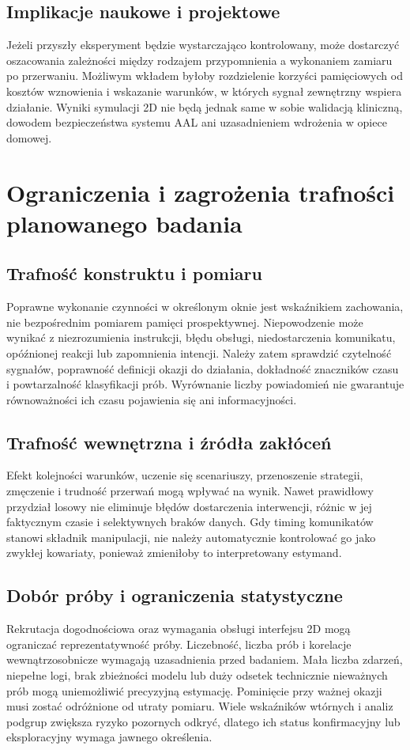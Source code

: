 \documentclass[11pt,a4paper]{article}
\begin{document}
\subsection{Implikacje naukowe i projektowe}
Jeżeli przyszły eksperyment będzie wystarczająco kontrolowany, może dostarczyć oszacowania zależności między rodzajem przypomnienia a wykonaniem zamiaru po przerwaniu. Możliwym wkładem byłoby rozdzielenie korzyści pamięciowych od kosztów wznowienia i wskazanie warunków, w których sygnał zewnętrzny wspiera działanie. Wyniki symulacji 2D nie będą jednak same w sobie walidacją kliniczną, dowodem bezpieczeństwa systemu AAL ani uzasadnieniem wdrożenia w opiece domowej.

\section{Ograniczenia i zagrożenia trafności planowanego badania}
\subsection{Trafność konstruktu i pomiaru}
Poprawne wykonanie czynności w określonym oknie jest wskaźnikiem zachowania, nie bezpośrednim pomiarem pamięci prospektywnej. Niepowodzenie może wynikać z niezrozumienia instrukcji, błędu obsługi, niedostarczenia komunikatu, opóźnionej reakcji lub zapomnienia intencji. Należy zatem sprawdzić czytelność sygnałów, poprawność definicji okazji do działania, dokładność znaczników czasu i powtarzalność klasyfikacji prób. Wyrównanie liczby powiadomień nie gwarantuje równoważności ich czasu pojawienia się ani informacyjności.

\subsection{Trafność wewnętrzna i źródła zakłóceń}
Efekt kolejności warunków, uczenie się scenariuszy, przenoszenie strategii, zmęczenie i trudność przerwań mogą wpływać na wynik. Nawet prawidłowy przydział losowy nie eliminuje błędów dostarczenia interwencji, różnic w jej faktycznym czasie i selektywnych braków danych. Gdy timing komunikatów stanowi składnik manipulacji, nie należy automatycznie kontrolować go jako zwykłej kowariaty, ponieważ zmieniłoby to interpretowany estymand.

\subsection{Dobór próby i ograniczenia statystyczne}
Rekrutacja dogodnościowa oraz wymagania obsługi interfejsu 2D mogą ograniczać reprezentatywność próby. Liczebność, liczba prób i korelacje wewnątrzosobnicze wymagają uzasadnienia przed badaniem. Mała liczba zdarzeń, niepełne logi, brak zbieżności modelu lub duży odsetek technicznie nieważnych prób mogą uniemożliwić precyzyjną estymację. Pominięcie przy ważnej okazji musi zostać odróżnione od utraty pomiaru. Wiele wskaźników wtórnych i analiz podgrup zwiększa ryzyko pozornych odkryć, dlatego ich status konfirmacyjny lub eksploracyjny wymaga jawnego określenia.
\end{document}

